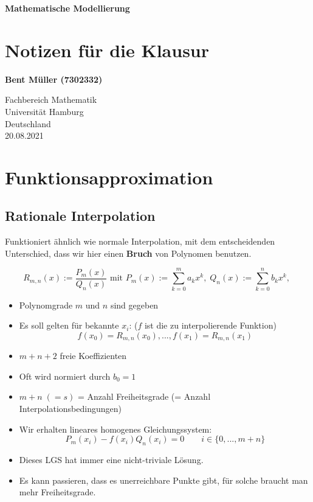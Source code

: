 \documentclass[a4paper]{article}
\begin{document}
\begin{titlepage}
	\begin{center}
		\vspace*{1cm}

		\textbf{Mathematische Modellierung}

		\vspace{0.5cm}
		\section*{
			Notizen für die Klausur
		}

		\vspace{1.5cm}

		\textbf{Bent Müller (7302332)}

		\vfill

		\vspace{0.8cm}


		Fachbereich Mathematik\\
		Universität Hamburg\\
		Deutschland\\
		20.08.2021

	\end{center}
\end{titlepage}

\pagebreak
\tableofcontents
\pagebreak

\section{Funktionsapproximation}

\subsection{Rationale Interpolation}

Funktioniert ähnlich wie normale Interpolation, mit dem entscheidenden
Unterschied, dass wir hier einen \textbf{Bruch} von Polynomen benutzen.

\[
	R_{m, n} (x) := \frac{ 
		P_m (x)
	}{ Q_n (x) } \text{ mit }
	P_m (x) := \sum_{k=0}^{m} a_k x^{k}, \;
	Q_n (x) := \sum_{k=0}^{n} b_k x^{k}, \;
\] 

\begin{itemize}
	\item Polynomgrade $m$ und $n$ sind gegeben
	\item Es soll gelten für bekannte $x_i$: ($f$ ist die zu 
		interpolierende Funktion)
		\[
			f(x_0) = R_{m, n} (x_0), ...,
			f(x_1) = R_{m, n} (x_1)
		\] 
	\item $m+n+2$ freie Koeffizienten
	\item Oft wird normiert durch $b_0 = 1$
	\item $m+n \; (=s)$ = Anzahl Freiheitsgrade (= Anzahl Interpolationsbedingungen)
	\item Wir erhalten lineares homogenes Gleichungssystem:
		\[
			P_m (x_i) - f(x_i) Q_n(x_i) = 0
			\qquad i \in \{
				0, ..., m+n
			\} 
		\] 
	\item Dieses LGS hat immer eine nicht-triviale Lösung.
	\item Es kann passieren, dass es unerreichbare Punkte gibt, für solche
		braucht man mehr Freiheitsgrade.
\end{itemize}
\end{document}

